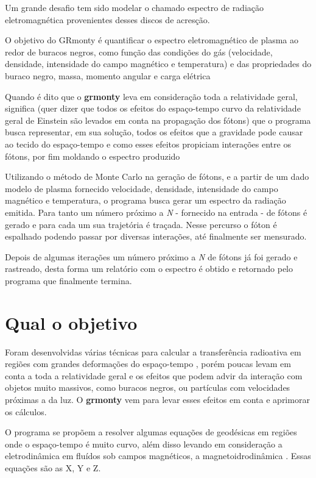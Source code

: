   Um grande desafio tem sido modelar o chamado espectro de radiação eletromagnética  provenientes desses discos de acresção.
  
  O objetivo do GRmonty é quantificar  o espectro eletromagnético de plasma ao redor de buracos negros, como função das condições do gás (velocidade, densidade,  intensidade do campo magnético e temperatura) e das propriedades do buraco negro, massa, momento angular e carga elétrica \cite{Dolence:09}
  
  

  Quando é dito que o \textbf{grmonty} leva em consideração toda a relatividade geral, significa (quer dizer que todos os efeitos do espaço-tempo curvo da relatividade geral de Einstein são levados em conta na propagação dos fótons) que o programa busca representar, em sua solução, todos os efeitos que a gravidade pode causar ao tecido do espaço-tempo e como esses efeitos propiciam interações entre os fótons, por fim moldando o espectro produzido

  Utilizando o método de Monte Carlo na geração de fótons, e a partir de um dado modelo de plasma fornecido velocidade, densidade,  intensidade do campo magnético e temperatura, o programa busca gerar um espectro da radiação emitida. Para tanto um número próximo a \textit{N} - fornecido na entrada - de fótons é gerado e para cada um sua trajetória é traçada. Nesse percurso o fóton é espalhado podendo passar por diversas interações, até finalmente ser mensurado.

  Depois de algumas iterações um número próximo a \textit{N} de fótons já foi gerado e rastreado, desta forma um relatório com o espectro é obtido e retornado pelo programa que finalmente termina.

\section{Qual o objetivo}
  Foram desenvolvidas várias técnicas para calcular a transferência radioativa em regiões com grandes deformações do espaço-tempo \cite{Dolence:09}, porém poucas levam em conta a toda a relatividade geral e os efeitos que podem advir da interação com objetos muito massivos, como buracos negros, ou partículas com velocidades próximas a da luz. O \textbf{grmonty} vem para levar esses efeitos em conta e aprimorar os cálculos.

  O programa se propõem a resolver algumas equações de geodésicas em regiões onde o espaço-tempo é muito curvo, além disso levando em consideração a eletrodinâmica em fluídos sob campos magnéticos, a magnetoidrodinâmica \cite{eletro-hidro-dynamic:42}. Essas equações são as X, Y e Z.

